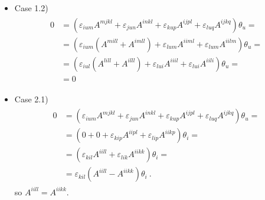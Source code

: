 \documentclass[letterpaper,10pt,english]{jupyterBook}
\begin{document}
\begin{itemize}
\begin{itemize}
\item {} 
\sphinxAtStartPar
Case 1.2)
\begin{equation*}
\begin{split}\begin{aligned}
       0 
       & = \left( \varepsilon_{ium} A^{mjkl} + \varepsilon_{jun} A^{inkl} + \varepsilon_{kup} A^{ijpl} + \varepsilon_{luq} A^{ijkq} \right) \theta_u = \\
       & = \left( \varepsilon_{ium} ( A^{mill} + A^{imll} ) + \varepsilon_{lum} A^{iiml} + \varepsilon_{lum} A^{iilm} \right) \theta_u = \\
       & = \left( \varepsilon_{iul} ( A^{lill} + A^{illl} ) + \varepsilon_{lui} A^{iiil} + \varepsilon_{lui} A^{iili} \right) \theta_u = \\
       & = 0
     \end{aligned}\end{split}
\end{equation*}
\item {} 
\sphinxAtStartPar
Case 2.1)
\begin{equation*}
\begin{split}\begin{aligned}
       0 
       & = \left( \varepsilon_{ium} A^{mjkl} + \varepsilon_{jun} A^{inkl} + \varepsilon_{kup} A^{ijpl} + \varepsilon_{luq} A^{ijkq} \right) \theta_u = \\
       & = \left(                          0 +                          0 + \varepsilon_{kip} A^{iipl} + \varepsilon_{lip} A^{iikp} \right) \theta_i = \\
       & = \left( \varepsilon_{kil} A^{iill} + \varepsilon_{lik} A^{iikk} \right) \theta_i = \\
       & = \varepsilon_{kil} \left( A^{iill} - A^{iikk} \right) \theta_i  \ .
     \end{aligned}\end{split}
\end{equation*}
\sphinxAtStartPar
so \(A^{iill} = A^{iikk}\).


\end{itemize}
\end{itemize}
\end{document}
